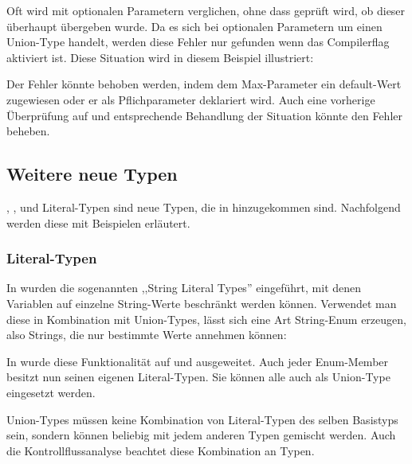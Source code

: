 Oft wird mit optionalen Parametern verglichen, ohne dass geprüft wird, ob dieser überhaupt übergeben wurde. Da es sich bei optionalen Parametern um einen Union-Type handelt, werden diese Fehler nur gefunden wenn das Compilerflag  aktiviert ist. Diese Situation wird in diesem Beispiel illustriert:


Der Fehler könnte behoben werden, indem dem Max-Parameter ein default-Wert zugewiesen oder er als Pflichparameter deklariert wird. Auch eine vorherige Überprüfung auf \tsundefined und entsprechende Behandlung der Situation könnte den Fehler beheben.

\subsection{Weitere neue Typen}
\tsthis, \tsnever, \tsobject und Literal-Typen sind neue Typen, die in  hinzugekommen sind. Nachfolgend werden diese mit Beispielen erläutert.

\subsubsection{Literal-Typen}
In  wurden die sogenannten ,,String Literal Types'' eingeführt, mit denen Variablen auf einzelne String-Werte beschränkt werden können. Verwendet man diese in Kombination mit Union-Types, lässt sich eine Art String-Enum erzeugen, also Strings, die nur bestimmte Werte annehmen können:


In  wurde diese Funktionalität auf \tsboolean und \tsnumber ausgeweitet. Auch jeder Enum-Member besitzt nun seinen eigenen Literal-Typen. Sie können alle auch als Union-Type eingesetzt werden.


Union-Types müssen keine Kombination von Literal-Typen des selben Basistyps sein, sondern können beliebig mit jedem anderen Typen gemischt werden. Auch die Kontrollflussanalyse beachtet diese Kombination an Typen.


